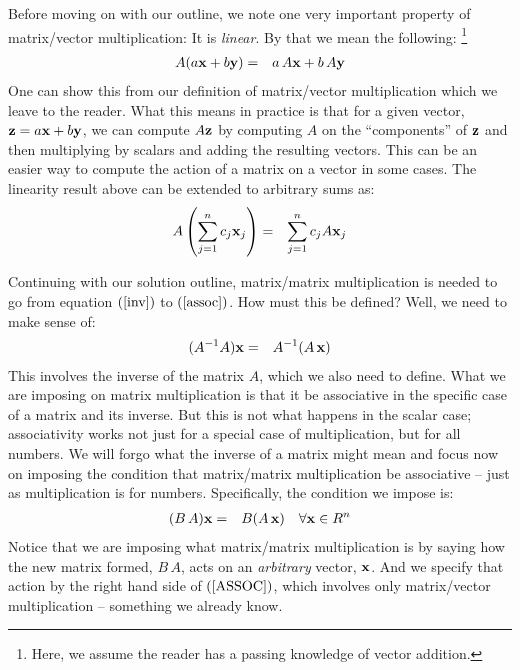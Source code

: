 \documentclass{article}
\begin{document}
Before moving on with our outline, we note one very important property of 
matrix/vector multiplication: It is {\em linear\/}.
By that we mean the following:%
\footnote{Here, we assume the reader has a passing knowledge of vector addition.}
\begin{eqnarray}
	A( a {\bf x} + b{\bf y} ) & = & a\, A{\bf x} + b\, A{\bf y}
\end{eqnarray}
One can show this from our definition of matrix/vector multiplication which we
leave to the reader. What this means in practice is that for a given vector, ${\bf z} = a{\bf x} + b{\bf y}$,
we can compute $A {\bf z}$ by computing $A$ on the ``components'' of ${\bf z}$ and then multiplying by scalars and adding
the resulting vectors.
This can be an easier way to compute the action of a matrix on a vector in some cases.
The linearity result above can be extended to arbitrary sums as:
\begin{eqnarray}
	A\left( \sum_{j=1}^n c_j {\bf x}_j \right) & = & \sum_{j=1}^n c_j A {\bf x}_j \label{linearity}
\end{eqnarray}

Continuing with our solution outline, matrix/matrix multiplication is needed
to go from equation $(\ref{inv})$ to $(\ref{assoc})$. How must this be defined?
Well, we need to make sense of:
\begin{eqnarray}
  (A^{-1} A) {\bf x} & = & A^{-1} (A \, {\bf x}) 
\end{eqnarray}
This involves the inverse of the matrix $A$, which we also need to define. 
What we are imposing on matrix multiplication is that it be associative in the
specific case of a matrix and its inverse. But this is not what happens in the scalar case;
associativity works not just for a special case of multiplication, but for all numbers.
We will forgo what the inverse of a matrix might mean and focus now on imposing the 
condition that matrix/matrix multiplication be associative -- just as multiplication is for numbers. 
Specifically, the condition we impose is:
\begin{eqnarray}
	(B\, A) {\bf x} & = & B (A \, {\bf x}) \quad \forall {\bf x} \in R^n \label{ASSOC}
\end{eqnarray}
Notice that we are imposing what matrix/matrix multiplication is by saying how the 
new matrix formed, $B \, A$, acts on an {\em arbitrary\/} vector, ${\bf x}$. And we 
specify that action by the right hand side of $(\ref{ASSOC})$, which involves only matrix/vector
multiplication -- something we already know.
\end{document}
